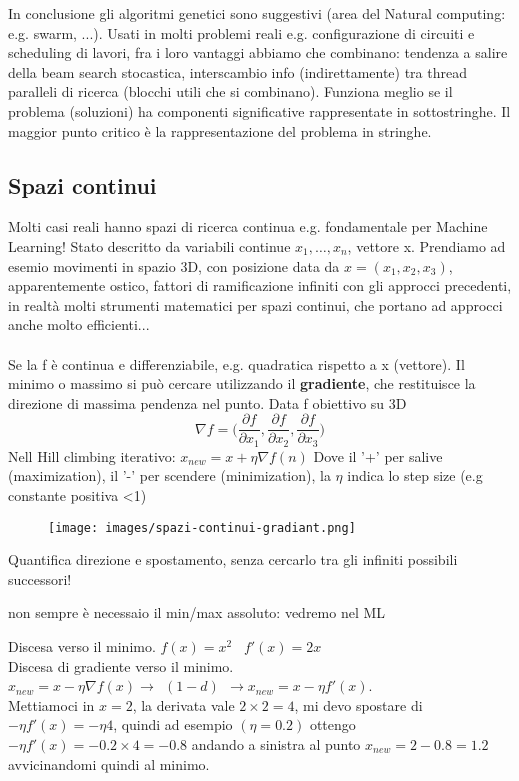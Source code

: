 \hspace{-15pt}In conclusione gli algoritmi genetici sono suggestivi (area del Natural computing: e.g. swarm, ...). Usati in molti problemi reali e.g. configurazione di
circuiti e scheduling di lavori, fra i loro vantaggi abbiamo che combinano: tendenza a salire della beam search stocastica, interscambio info (indirettamente) tra thread paralleli di
ricerca (blocchi utili che si combinano). Funziona meglio se il problema (soluzioni) ha componenti significative rappresentate in sottostringhe.
Il maggior punto critico è la rappresentazione del problema in stringhe.

\subsection{Spazi continui}
Molti casi reali hanno spazi di ricerca continua e.g. fondamentale per Machine Learning! Stato descritto da variabili continue $x_1, \dots, x_n$, vettore x.
Prendiamo ad esemio movimenti in spazio 3D, con posizione data da $x = (x_1, x_2, x_3)$, apparentemente ostico, fattori di ramificazione infiniti con gli
approcci precedenti, in realtà molti strumenti matematici per spazi continui, che portano ad approcci anche molto efficienti...\\\\
Se la f è continua e differenziabile, e.g. quadratica rispetto a x (vettore). Il minimo o massimo si può cercare utilizzando il \textbf{gradiente}, che restituisce la
direzione di massima pendenza nel punto. Data f obiettivo su 3D
$$\nabla f = \Big ( \frac{\partial f}{\partial x_1}, \frac{\partial f}{\partial x_2}, \frac{\partial f}{\partial x_3})$$
Nell Hill climbing iterativo: $x_{new} = x + \eta\nabla f(n)$
Dove il '+' per salive (maximization), il '-' per scendere (minimization), la $\eta$ indica lo step size (e.g constante positiva <1)
\begin{figure}[h!]
    \centering
    \texttt{[image: images/spazi-continui-gradiant.png]}
\end{figure}
Quantifica direzione e spostamento, senza cercarlo tra gli infiniti possibili successori!
\begin{note}
    non sempre è necessaio il min/max assoluto: vedremo nel ML
\end{note}
\begin{example}
    Discesa verso il minimo. $f(x) = x^2 \hspace{10pt} f'(x) = 2x$\\
    Discesa di gradiente verso il minimo. $x_{new} = x - \eta \nabla f(x) \to \:\:(1-d) \:\: \to x_{new} = x - \eta f'(x)$.\\
    Mettiamoci in $x=2$, la derivata vale $2 \times 2=4$, mi devo spostare di $-\eta f'(x) = -\eta4$, quindi ad esempio $(\eta = 0.2)$ ottengo $-\eta f'(x) = -0.2 \times 4 = -0.8$ andando a sinistra al punto $x_{new} = 2 - 0.8 = 1.2$ avvicinandomi quindi al minimo.
\end{example}

